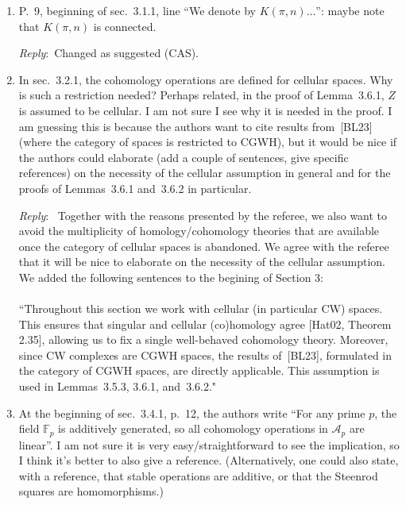 \documentclass{amsart}
\newcommand{\ar}{\medskip\noindent\textit{Reply}:\ }
\begin{document}
	\begin{enumerate}
		\item P.~9, beginning of sec.~3.1.1, line ``We denote by $K(\pi, n)\dots$'':
		maybe note that $K(\pi, n)$ is connected.

		\ar Changed as suggested (CAS).

		\item In sec.~3.2.1, the cohomology operations are defined for cellular spaces.
		Why is such a restriction needed? Perhaps related, in the proof of Lemma~3.6.1, $Z$ is assumed to be cellular. I am not sure I see why it is needed in the proof.
		I am guessing this is because the authors want to cite results from~[BL23] (where the category of spaces is restricted to CGWH), but it would be
		nice if the authors could elaborate (add a couple of sentences, give specific references) on the necessity of the cellular assumption in general and for
		the proofs of Lemmas~3.6.1 and~3.6.2 in particular.

		\ar
		Together with the reasons presented by the referee, we also want to avoid the multiplicity of homology/cohomology theories that are available once the category of cellular spaces is abandoned.
		We agree with the referee that it will be nice to elaborate on the necessity of the cellular assumption. We added the following sentences to the begining of Section 3: \\
		\\
		``Throughout this section we work with cellular (in particular CW) spaces.
		This ensures that singular and cellular (co)homology agree [Hat02, Theorem 2.35], allowing us to fix a single well-behaved cohomology theory.
		Moreover, since CW complexes are CGWH spaces, the results of~[BL23], formulated in the category of CGWH spaces, are directly applicable.
		This assumption is used in Lemmas~3.5.3, 3.6.1, and~3.6.2."

		\item At the beginning of sec.~3.4.1, p.~12, the authors write ``For any prime $p$, the field $\mathbb{F}_p$ is additively generated, so all cohomology operations in $\mathcal{A}_p$ are linear''. I am not sure it is very easy/straightforward to see the implication, so I think it’s better to also give a reference. (Alternatively, one could also state, with a reference, that stable operations are additive, or that the Steenrod squares are homomorphisms.)


\end{enumerate}
\end{document}
